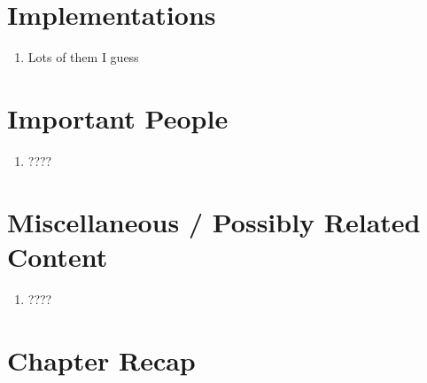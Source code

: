 \documentclass[thesis-solanki.tex]{subfiles}
\begin{document}
\section{Implementations}
\begin{enumerate}
\item Lots of them I guess
\end{enumerate}

\section{Important People}
\begin{enumerate}
\item ????
\end{enumerate}

\section{Miscellaneous / Possibly Related Content}
\begin{enumerate}
\item ????
\end{enumerate}

\section{Chapter Recap}
\end{document}
